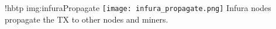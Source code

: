 \namedfigure
{!hbtp}
{img:infuraPropagate}
{\texttt{[image: infura\_propagate.png]}}
{Infura nodes propagate the TX to other nodes and miners.}
